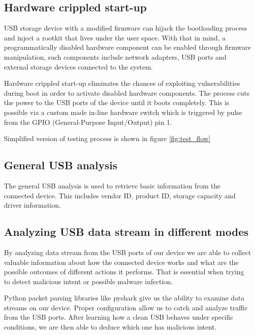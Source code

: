 \documentclass[sigconf]{acmart}
\begin{document}
\subsection{Hardware crippled start-up}
\par \quad USB storage device with a modified firmware can hijack the bootloading process and inject a rootkit that lives under the user space. With that in mind, a programmatically disabled hardware component can be enabled through firmware manipulation, such components include network adapters, USB ports and external storage devices connected to the system.
\par Hardware crippled start-up eliminates the chances of exploiting vulnerabilities during boot in order to activate disabled hardware components. The process cuts the power to the USB ports of the device until it boots completely. This is possible via a custom made in-line hardware switch which is triggered by pulse from the GPIO (General-Purpose Input/Output) pin 1.
\par Simplified version of testing process is shown in figure \ref{fig:test_flow}

\subsection{General USB analysis}
\par \quad The general USB analysis is used to retrieve basic information from the connected device. This includes vendor ID, product ID, storage capacity and driver information.

\subsection{Analyzing USB data stream in different modes}
\par \quad By analyzing data stream from the USB ports of our device we are able to collect valuable information about how the connected device works and what are the possible outcomes of different actions it performs. That is essential when trying to detect malicious intent or possible malware infection.
\par Python packet parsing libraries like pyshark \cite{pyshark} give us the ability to examine data streams on our device. Proper configuration allow us to catch and analyze traffic from the USB ports. After learning how a clean USB behaves under specific conditions, we are then able to deduce which one has malicious intent.
\end{document}
